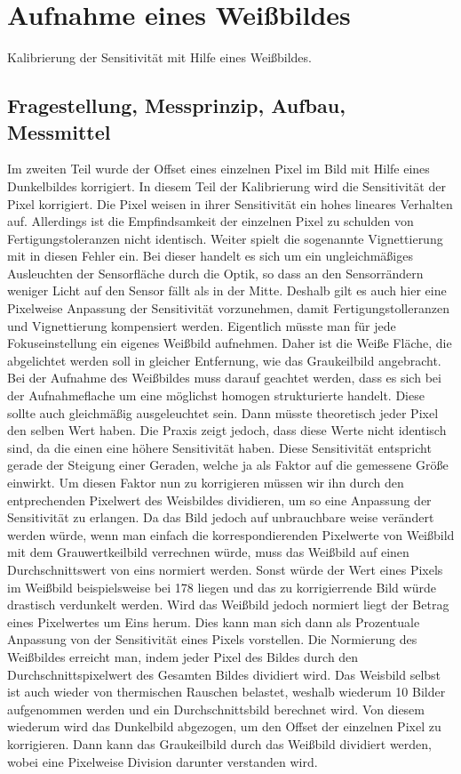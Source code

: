 %
%
\chapter{Aufnahme eines Weißbildes}
\label{chap:VERSUCH_3}
Kalibrierung der Sensitivität mit Hilfe eines Weißbildes.
\section{Fragestellung, Messprinzip, Aufbau, Messmittel}
\label{chap:VERSUCH_3_FRAGESTELLUNG}
Im zweiten Teil wurde der Offset eines einzelnen Pixel im Bild mit Hilfe eines Dunkelbildes korrigiert. In diesem Teil der Kalibrierung wird die Sensitivität der Pixel korrigiert. Die Pixel weisen in ihrer Sensitivität ein hohes lineares Verhalten auf. Allerdings ist die Empfindsamkeit der einzelnen Pixel zu schulden von Fertigungstoleranzen nicht identisch. Weiter spielt die sogenannte Vignettierung mit in diesen Fehler ein. Bei dieser handelt es sich um ein ungleichmäßiges Ausleuchten der Sensorfläche durch die Optik, so dass an den Sensorrändern weniger Licht auf den Sensor fällt als in der Mitte. Deshalb gilt es auch hier eine Pixelweise Anpassung der Sensitivität vorzunehmen, damit Fertigungstolleranzen und Vignettierung kompensiert werden. Eigentlich müsste man für jede Fokuseinstellung ein eigenes Weißbild aufnehmen. Daher ist die Weiße Fläche, die abgelichtet werden soll in gleicher Entfernung, wie das Graukeilbild angebracht. 
Bei der Aufnahme des Weißbildes muss darauf geachtet werden, dass es sich bei der Aufnahmeflache um eine möglichst homogen strukturierte handelt. Diese sollte auch gleichmäßig ausgeleuchtet sein.
Dann müsste theoretisch jeder Pixel den selben Wert haben. Die Praxis zeigt jedoch, dass diese Werte nicht identisch sind, da die einen eine höhere Sensitivität haben. Diese Sensitivität entspricht gerade der Steigung einer Geraden, welche ja als Faktor auf die gemessene Größe einwirkt. Um diesen Faktor nun zu korrigieren müssen wir ihn durch den entprechenden Pixelwert des Weisbildes dividieren, um so eine Anpassung der Sensitivität zu erlangen. Da das Bild jedoch auf unbrauchbare weise verändert werden würde, wenn man einfach die korrespondierenden Pixelwerte von Weißbild mit dem Grauwertkeilbild verrechnen würde, muss das Weißbild auf einen Durchschnittswert von eins normiert werden. Sonst würde der Wert eines Pixels im Weißbild beispielsweise bei 178 liegen und das zu korrigierrende Bild würde drastisch verdunkelt werden. Wird das Weißbild jedoch normiert liegt der Betrag eines Pixelwertes um Eins herum. Dies kann man sich dann als Prozentuale Anpassung von der Sensitivität eines Pixels vorstellen. Die Normierung des Weißbildes erreicht man, indem jeder Pixel des Bildes durch den Durchschnittspixelwert des Gesamten Bildes dividiert wird.
Das Weisbild selbst ist auch wieder von thermischen Rauschen belastet, weshalb wiederum 10 Bilder aufgenommen werden und ein Durchschnittsbild berechnet wird. Von diesem wiederum wird das Dunkelbild abgezogen, um den Offset der einzelnen Pixel zu korrigieren.
Dann kann das Graukeilbild durch das Weißbild dividiert werden, wobei eine Pixelweise Division darunter verstanden wird.

